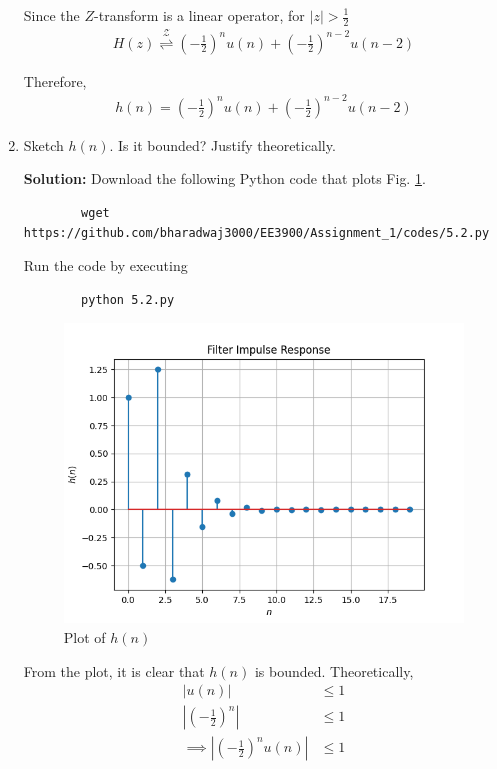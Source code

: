 \documentclass[journal,12pt,twocolumn]{IEEEtran}
\newcommand{\solution}{\noindent \textbf{Solution: }}
\providecommand{\brak}[1]{\ensuremath{\left(#1\right)}}
\providecommand{\abs}[1]{\left\vert#1\right\vert}
\providecommand{\ztrans}{\overset{\mathcal{Z}}{ \rightleftharpoons}}
\numberwithin{equation}{section}
\renewcommand\thesection{\arabic{section}}
\begin{document}
\begin{enumerate}[label=\thesection.\arabic*]
	Since the $Z$-transform is a linear operator, for $\abs{z} > \frac12$
	\begin{align}
		H(z) \ztrans \brak{-\frac12}^n u(n) + \brak{-\frac12}^{n-2} u(n-2)
	\end{align}
	
	Therefore, 
	\begin{align}
		h(n) = \brak{-\frac12}^n u(n) + \brak{-\frac12}^{n-2} u(n-2)
	\end{align}
	
	\item Sketch $h(n)$. Is it bounded? Justify theoretically.
	
	\solution Download the following Python code that plots Fig. \ref{fig-5.2}.
	\begin{lstlisting}
		wget https://github.com/bharadwaj3000/EE3900/Assignment_1/codes/5.2.py
	\end{lstlisting}
	
	Run the code by executing
	\begin{lstlisting}
		python 5.2.py
	\end{lstlisting}

	\begin{figure}[!ht]
		\centering
		\includegraphics[width=\columnwidth]{./figs/5.2.png}
		\caption{Plot of $h(n)$}
		\label{fig-5.2}	
	\end{figure} 
	
	From the plot, it is clear that $h(n)$ is bounded. Theoretically,
	\begin{align}
		\abs{u(n)} &\le 1 \\
		\abs{\brak{-\frac12}^n} &\le 1 \\
		\implies \abs{\brak{-\frac12}^n u(n)} &\le 1
	\end{align}
	

\end{enumerate}
\end{document}

